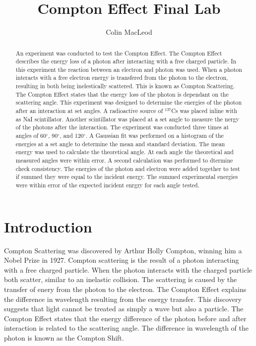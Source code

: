 \documentclass[prb,preprint,groupaddress,showpacs,superbib,floats]{revtex4-1}
\begin{document}


\title{Compton Effect Final Lab}
\author{Colin MacLeod}

\begin{abstract}

An experiment was conducted to test the Compton Effect. The Compton Effect describes the energy loss of a photon after interacting with a free charged particle. In this experiment the reaction between an electron and photon was used. When a photon interacts with a free electron energy is transfered from the photon to the electron, resulting in both being inelestically scattered. This is known as Compton Scattering. The Compton Effect states that the energy loss of the photon is dependant on the scattering angle. This experiment was designed to determine the energies of the photon after an interaction at set angles. A radioactive source of $^{137}$Cs was placed inline with as NaI scintillator. Another scintillator was placed at a set angle to measure the nergy of the photons after the interaction. The experiment was conducted three times at angles of 60$^{\circ}$, 90$^{\circ}$, and 120$^{\circ}$. A Gaussian fit was performed on a histogram of the energies at a set angle to determine the mean and standard deviation. The mean energy was used to calculate the theoretical angle. At each angle the theoretical and measured angles were within error. A second calculation was performed to dtermine check consistency. The energies of the photon and electron were added together to test if summed they were equal to the incident energy. The summed experimental energies were within error of the expected incident enrgry for each angle tested.


\end{abstract}

\maketitle

\section{Introduction}\label{introduction}

Compton Scattering was discovered by Arthur Holly Compton, winning him a Nobel Prize in 1927. Compton scattering is the result of a photon interacting with a free charged particle. When the photon interacts with the charged particle both scatter, similar to an inelastic collision. The scattering is caused by the transfer of enery from the photon to the electron. The Compton Effect explains the difference in wavelength resulting from the energy transfer. This discovery suggests that light cannot be treated as simply a wave but also a particle. The Compton Effect states that the energy difference of the photon before and after interaction is related to the scattering angle. The difference in wavelength of the photon is known as the Compton Shift. 
\end{document}
